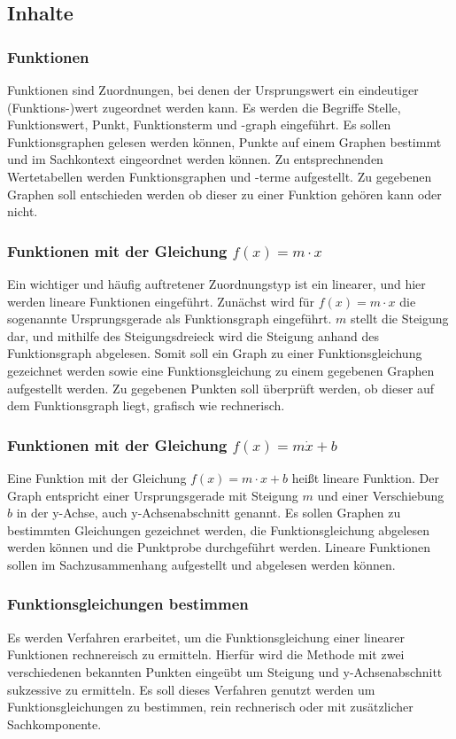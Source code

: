\documentclass{article}
\begin{document}
\subsection{Inhalte}
\subsubsection*{Funktionen}
Funktionen sind Zuordnungen, bei denen der Ursprungswert ein eindeutiger (Funktions-)wert zugeordnet werden kann.
Es werden die Begriffe Stelle, Funktionswert, Punkt, Funktionsterm und -graph eingeführt.
Es sollen Funktionsgraphen gelesen werden können, Punkte auf einem Graphen bestimmt und im Sachkontext eingeordnet werden können. 
Zu entsprechnenden Wertetabellen werden Funktionsgraphen und -terme aufgestellt. 
Zu gegebenen Graphen soll entschieden werden ob dieser zu einer Funktion gehören kann oder nicht.
\subsubsection*{Funktionen mit der Gleichung $f(x) = m \cdot x$}
Ein wichtiger und häufig auftretener Zuordnungstyp ist ein linearer, und hier werden lineare Funktionen eingeführt.
Zunächst wird für $f(x) = m \cdot x$ die sogenannte Ursprungsgerade als Funktionsgraph eingeführt. $m$ stellt die Steigung dar, und mithilfe des Steigungsdreieck wird die Steigung anhand des Funktionsgraph abgelesen.
Somit soll ein Graph zu einer Funktionsgleichung gezeichnet werden sowie eine Funktionsgleichung zu einem gegebenen Graphen aufgestellt werden.
Zu gegebenen Punkten soll überprüft werden, ob dieser auf dem Funktionsgraph liegt, grafisch wie rechnerisch.
\subsubsection*{Funktionen mit der Gleichung $f(x) = m \dot x + b$}
Eine Funktion mit der Gleichung $f(x) = m \cdot x + b$ heißt lineare Funktion. Der Graph entspricht einer Ursprungsgerade mit Steigung $m$ und einer Verschiebung $b$ in der y-Achse, auch y-Achsenabschnitt genannt.
Es sollen Graphen zu bestimmten Gleichungen gezeichnet werden, die Funktionsgleichung abgelesen werden können und die Punktprobe durchgeführt werden.
Lineare Funktionen sollen im Sachzusammenhang aufgestellt und abgelesen werden können.
\subsubsection*{Funktionsgleichungen bestimmen}
Es werden Verfahren erarbeitet, um die Funktionsgleichung einer linearer Funktionen rechnereisch zu ermitteln. Hierfür wird die Methode mit zwei verschiedenen bekannten Punkten eingeübt um Steigung und y-Achsenabschnitt sukzessive zu ermitteln.
Es soll dieses Verfahren genutzt werden um Funktionsgleichungen zu bestimmen, rein rechnerisch oder mit zusätzlicher Sachkomponente.
\end{document}
